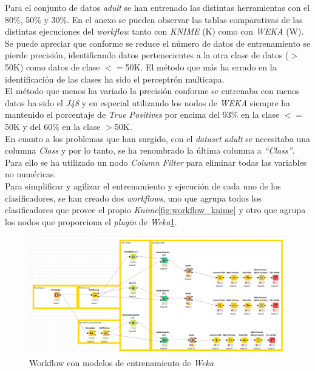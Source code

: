 \documentclass[10pt,a4paper]{article}
\begin{document}
Para el conjunto de datos \emph{adult} se han entrenado las distintas herramientas con el 80\%, 50\% y 30\%.
En el anexo se pueden observar las tablas comparativas de las distintas ejecuciones del \emph{workflow} tanto con \emph{KNIME} (K) como con \emph{WEKA} (W). Se puede apreciar que conforme se reduce el número de datos de entrenamiento se pierde precisión, identificando datos pertenecientes a la otra clase de datos ($>$50K) como datos de clase $<=$50K. El método que más ha errado en la identificación de las clases ha sido el perceptrón multicapa.\\
El método que menos ha variado la precisión conforme se entrenaba con menos datos ha sido el \emph{J48} y en especial utilizando los nodos de \emph{WEKA} siempre ha mantenido el porcentaje de \emph{True Positives} por encima del 93\% en la clase $<=$50K y del 60\% en la clase $>$50K.\\

En cuanto a los problemas que han surgido, con el \emph{dataset} \emph{adult} se necesitaba una columna \emph{Class} y por lo tanto, se ha renombrado la última columna a \emph{``Class''}. Para ello se ha utilizado un nodo \emph{Column Filter} para eliminar todas las variables no numéricas.\\

Para simplificar y agilizar el entrenamiento y ejecución de cada uno de los clasificadores, se han creado dos \textit{workflows}, uno que agrupa todos los clasificadores que provee el propio \textit{Knime}\ref{fig:workflow_knime} y otro que agrupa los nodos que proporciona el \textit{plugin} de \textit{Weka}\ref{fig:workflow_weka}.
\begin{figure}[h!]
	\centering
	\includegraphics[scale=0.5]{images/workflow_weka.png}
	\caption{Workflow con modelos de entrenamiento de \textit{Weka}}
	\label{fig:workflow_weka}
\end{figure}
\end{document}
